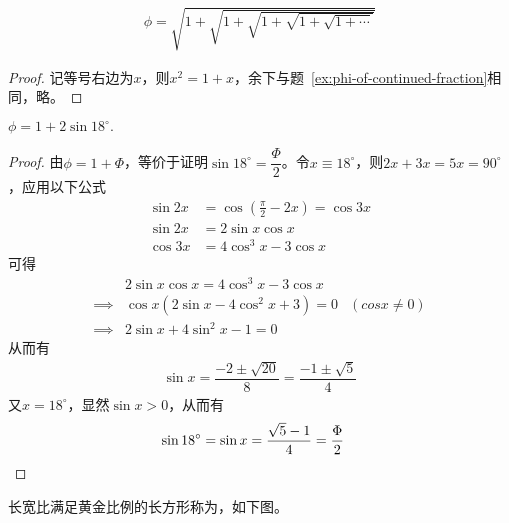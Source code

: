 \begin{example}[平方根表示]
  \begin{align}
    \phi=\sqrt{1+\sqrt{1+\sqrt{1+\sqrt{1+\sqrt{1+\cdots}}}}}
  \end{align}
\end{example}
\begin{proof}
  记等号右边为$x$，则$x^2 = 1 + x$，余下与题~\ref{ex:phi-of-continued-fraction}相同，略。
\end{proof}

\begin{example}[三角函数表示]
  $\phi=1 + 2\sin18^\circ.$
\end{example}
\begin{proof}
  由$\phi=1+\Phi$，等价于证明$\sin18^\circ=\dfrac\Phi2$。令$x\equiv18^\circ$，则$2x+3x=5x=90^\circ$，应用以下公式
  \begin{align*}
    \sin 2x &= \cos \left(\frac\pi2 - 2x\right) = \cos 3x\\
    \sin 2x &=2\sin x\cos x\\
    \cos 3x &= 4\cos^3x-3\cos x
  \end{align*}
  可得
  \begin{align*}
    &2\sin x\cos x = 4\cos^3x-3\cos x\\
    \implies& \cos x(2\sin x - 4\cos^2 x + 3) = 0  & (cos x\ne 0)\\
    \implies & 2\sin x + 4\sin^2 x - 1 = 0 
  \end{align*}
  从而有
  \begin{align*}
    \sin x = \dfrac{-2\pm\sqrt{20}}{8}=\dfrac{-1\pm\sqrt5}4
  \end{align*}
又$x=18^\circ$，显然$\sin x>0$，从而有
\begin{align*}
  \sin18^\circ&=\sin x =\dfrac{\sqrt5-1}4=\dfrac\Phi2\qedhere
\end{align*}
\end{proof}

\begin{example}[黄金长方形]
  长宽比满足黄金比例的长方形称为，如下图。\par
  \begin{center}
  \end{center}
\end{example}

